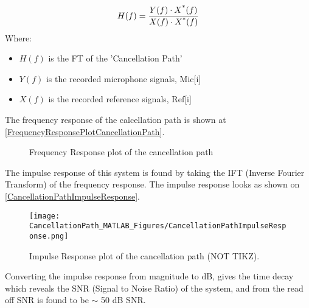 \begin{equation}
\label{FrequencyResponseEq}
H(f) = \frac{Y(f) \cdot X\textsuperscript{*}(f)}{X(f) \cdot X\textsuperscript{*}(f)}
\end{equation}
Where:
\begin{itemize}
	\item $H(f)$ is the FT of the 'Cancellation Path'
	\item $Y(f)$ is the recorded microphone signals, Mic[i]
	\item $X(f)$ is the recorded reference signals, Ref[i]
\end{itemize}

The frequency response of the calcellation path is shown at \autoref{FrequencyResponsePlotCancellationPath}.

\begin{figure}[H]
	\centering
	
	\caption{Frequency Response plot of the cancellation path}
	\label{FrequencyResponsePlotCancellationPath}
\end{figure}



The impulse response of this system is found by taking the IFT (Inverse Fourier Transform) of the frequency response.
The impulse response looks as shown on \autoref{CancellationPathImpulseResponse}.

\begin{figure}[H]
	\centering
	\texttt{[image: CancellationPath\_MATLAB\_Figures/CancellationPathImpulseResponse.png]}
	\caption{Impulse Response plot of the cancellation path (NOT TIKZ).}
	\label{CancellationPathImpulseResponse}
\end{figure}

Converting the impulse response from magnitude to dB, gives the time decay which reveals the SNR (Signal to Noise Ratio) of the system, and from the read off SNR is found to be $\sim$ 50 dB SNR.

